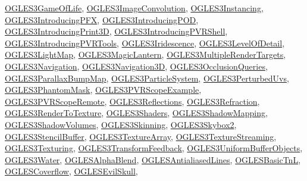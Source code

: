 \hyperlink{class_o_g_l_e_s3_game_of_life}{O\+G\+L\+E\+S3\+Game\+Of\+Life}, \hyperlink{class_o_g_l_e_s3_image_convolution}{O\+G\+L\+E\+S3\+Image\+Convolution}, \hyperlink{class_o_g_l_e_s3_instancing}{O\+G\+L\+E\+S3\+Instancing}, \hyperlink{class_o_g_l_e_s3_introducing_p_f_x}{O\+G\+L\+E\+S3\+Introducing\+P\+F\+X}, \hyperlink{class_o_g_l_e_s3_introducing_p_o_d}{O\+G\+L\+E\+S3\+Introducing\+P\+O\+D}, \hyperlink{class_o_g_l_e_s3_introducing_print3_d}{O\+G\+L\+E\+S3\+Introducing\+Print3\+D}, \hyperlink{class_o_g_l_e_s3_introducing_p_v_r_shell}{O\+G\+L\+E\+S3\+Introducing\+P\+V\+R\+Shell}, \hyperlink{class_o_g_l_e_s3_introducing_p_v_r_tools}{O\+G\+L\+E\+S3\+Introducing\+P\+V\+R\+Tools}, \hyperlink{class_o_g_l_e_s3_iridescence}{O\+G\+L\+E\+S3\+Iridescence}, \hyperlink{class_o_g_l_e_s3_level_of_detail}{O\+G\+L\+E\+S3\+Level\+Of\+Detail}, \hyperlink{class_o_g_l_e_s3_light_map}{O\+G\+L\+E\+S3\+Light\+Map}, \hyperlink{class_o_g_l_e_s3_magic_lantern}{O\+G\+L\+E\+S3\+Magic\+Lantern}, \hyperlink{class_o_g_l_e_s3_multiple_render_targets}{O\+G\+L\+E\+S3\+Multiple\+Render\+Targets}, \hyperlink{class_o_g_l_e_s3_navigation}{O\+G\+L\+E\+S3\+Navigation}, \hyperlink{class_o_g_l_e_s3_navigation3_d}{O\+G\+L\+E\+S3\+Navigation3\+D}, \hyperlink{class_o_g_l_e_s3_occlusion_queries}{O\+G\+L\+E\+S3\+Occlusion\+Queries}, \hyperlink{class_o_g_l_e_s3_parallax_bump_map}{O\+G\+L\+E\+S3\+Parallax\+Bump\+Map}, \hyperlink{class_o_g_l_e_s3_particle_system}{O\+G\+L\+E\+S3\+Particle\+System}, \hyperlink{class_o_g_l_e_s3_perturbed_uvs}{O\+G\+L\+E\+S3\+Perturbed\+Uvs}, \hyperlink{class_o_g_l_e_s3_phantom_mask}{O\+G\+L\+E\+S3\+Phantom\+Mask}, \hyperlink{class_o_g_l_e_s3_p_v_r_scope_example}{O\+G\+L\+E\+S3\+P\+V\+R\+Scope\+Example}, \hyperlink{class_o_g_l_e_s3_p_v_r_scope_remote}{O\+G\+L\+E\+S3\+P\+V\+R\+Scope\+Remote}, \hyperlink{class_o_g_l_e_s3_reflections}{O\+G\+L\+E\+S3\+Reflections}, \hyperlink{class_o_g_l_e_s3_refraction}{O\+G\+L\+E\+S3\+Refraction}, \hyperlink{class_o_g_l_e_s3_render_to_texture}{O\+G\+L\+E\+S3\+Render\+To\+Texture}, \hyperlink{class_o_g_l_e_s3_shaders}{O\+G\+L\+E\+S3\+Shaders}, \hyperlink{class_o_g_l_e_s3_shadow_mapping}{O\+G\+L\+E\+S3\+Shadow\+Mapping}, \hyperlink{class_o_g_l_e_s3_shadow_volumes}{O\+G\+L\+E\+S3\+Shadow\+Volumes}, \hyperlink{class_o_g_l_e_s3_skinning}{O\+G\+L\+E\+S3\+Skinning}, \hyperlink{class_o_g_l_e_s3_skybox2}{O\+G\+L\+E\+S3\+Skybox2}, \hyperlink{class_o_g_l_e_s3_stencil_buffer}{O\+G\+L\+E\+S3\+Stencil\+Buffer}, \hyperlink{class_o_g_l_e_s3_texture_array}{O\+G\+L\+E\+S3\+Texture\+Array}, \hyperlink{class_o_g_l_e_s3_texture_streaming}{O\+G\+L\+E\+S3\+Texture\+Streaming}, \hyperlink{class_o_g_l_e_s3_texturing}{O\+G\+L\+E\+S3\+Texturing}, \hyperlink{class_o_g_l_e_s3_transform_feedback}{O\+G\+L\+E\+S3\+Transform\+Feedback}, \hyperlink{class_o_g_l_e_s3_uniform_buffer_objects}{O\+G\+L\+E\+S3\+Uniform\+Buffer\+Objects}, \hyperlink{class_o_g_l_e_s3_water}{O\+G\+L\+E\+S3\+Water}, \hyperlink{class_o_g_l_e_s_alpha_blend}{O\+G\+L\+E\+S\+Alpha\+Blend}, \hyperlink{class_o_g_l_e_s_antialiased_lines}{O\+G\+L\+E\+S\+Antialiased\+Lines}, \hyperlink{class_o_g_l_e_s_basic_tn_l}{O\+G\+L\+E\+S\+Basic\+Tn\+L}, \hyperlink{class_o_g_l_e_s_coverflow}{O\+G\+L\+E\+S\+Coverflow}, \hyperlink{class_o_g_l_e_s_evil_skull}{O\+G\+L\+E\+S\+Evil\+Skull}, 